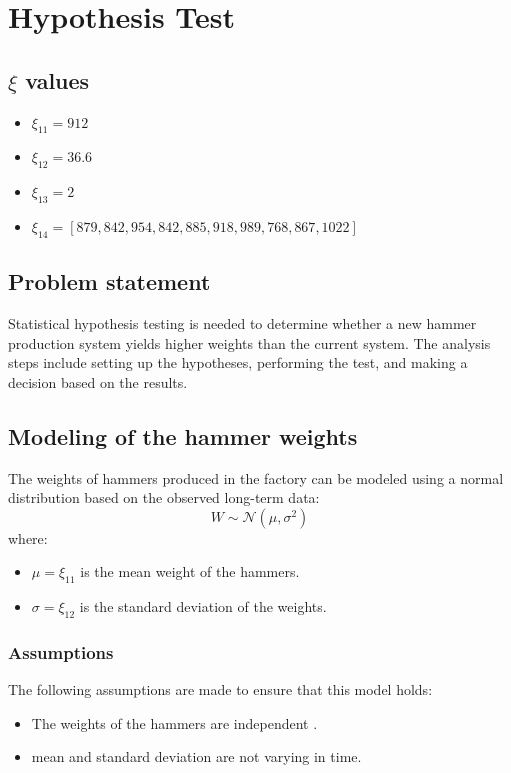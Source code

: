 \chapter{Hypothesis Test}

\section*{$\xi$ values}

\begin{itemize}
    \item $\xi_{11} = 912$
    \item $\xi_{12} = 36.6$
    \item $\xi_{13} = 2$
    \item $\xi_{14} = [879, 842, 954, 842, 885, 918, 989, 768, 867, 1022]$
\end{itemize}


\section*{Problem statement}

Statistical hypothesis testing is needed to determine whether a new hammer production system yields higher weights than the current system.
The analysis steps include setting up the hypotheses, performing the test, and making a decision based on the results.

\section{Modeling of the hammer weights}

The weights of hammers produced in the factory can be modeled using a normal distribution based on the observed long-term data:
\begin{equation}
W \sim \mathcal{N}(\mu, \sigma^2)
\end{equation}
where:
\begin{itemize}
    \item $\mu = \xi_{11}$ is the mean weight of the hammers.
    \item $\sigma = \xi_{12}$ is the standard deviation of the weights.
\end{itemize}

\subsection*{Assumptions}
The following assumptions are made to ensure that this model holds:
\begin{itemize}
    \item The weights of the hammers are independent .
    \item mean and standard deviation are not varying in time.
\end{itemize}


